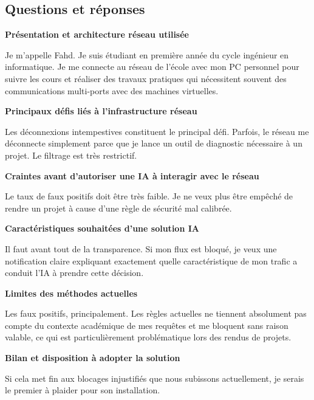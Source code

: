 \documentclass[12pt,a4paper]{report}
\begin{document}
\subsection*{Questions et réponses}

\textbf{Présentation et architecture réseau utilisée}

Je m'appelle Fahd. Je suis \'{e}tudiant en premi\`{e}re ann\'{e}e du cycle ing\'{e}nieur en informatique. Je me connecte au r\'{e}seau de l'\'{e}cole avec mon PC personnel pour suivre les cours et r\'{e}aliser des travaux pratiques qui n\'{e}cessitent souvent des communications multi-ports avec des machines virtuelles.

\bigskip
\textbf{Principaux défis liés à l'infrastructure réseau}

Les d\'{e}connexions intempestives constituent le principal d\'{e}fi. Parfois, le r\'{e}seau me d\'{e}connecte simplement parce que je lance un outil de diagnostic n\'{e}cessaire \`{a} un projet. Le filtrage est tr\`{e}s restrictif.

\bigskip
\textbf{Craintes avant d'autoriser une IA à interagir avec le réseau}

Le taux de faux positifs doit \^{e}tre tr\`{e}s faible. Je ne veux plus \^{e}tre emp\^{e}ch\'{e} de rendre un projet \`{a} cause d'une r\`{e}gle de s\'{e}curit\'{e} mal calibr\'{e}e.

\bigskip
\textbf{Caractéristiques souhaitées d'une solution IA}

Il faut avant tout de la transparence. Si mon flux est bloqu\'{e}, je veux une notification claire expliquant exactement quelle caract\'{e}ristique de mon trafic a conduit l'IA \`{a} prendre cette d\'{e}cision.

\bigskip
\textbf{Limites des méthodes actuelles}

Les faux positifs, principalement. Les r\`{e}gles actuelles ne tiennent absolument pas compte du contexte acad\'{e}mique de mes requ\^{e}tes et me bloquent sans raison valable, ce qui est particuli\`{e}rement probl\'{e}matique lors des rendus de projets.

\bigskip
\textbf{Bilan et disposition à adopter la solution}

Si cela met fin aux blocages injustifi\'{e}s que nous subissons actuellement, je serais le premier \`{a} plaider pour son installation.

\clearpage

\end{document}
